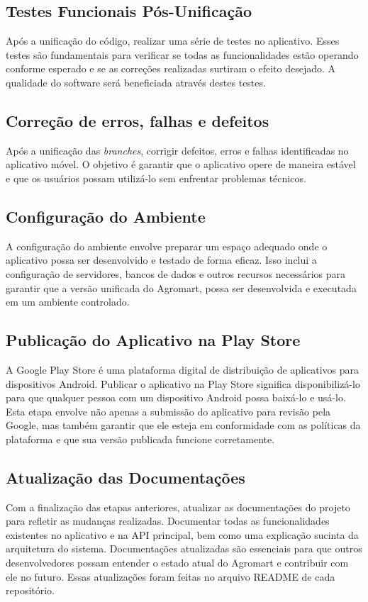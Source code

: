 \subsection{Testes Funcionais Pós-Unificação}
Após a unificação do código, realizar uma série de testes no aplicativo. Esses testes são fundamentais para verificar se todas as funcionalidades estão operando conforme esperado e se as correções realizadas surtiram o efeito desejado. A qualidade do software será beneficiada através destes testes.

\subsection{Correção de erros, falhas e defeitos}
Após a unificação das \textit{branches}, corrigir defeitos, erros e falhas identificadas no aplicativo móvel. O objetivo é garantir que o aplicativo opere de maneira estável e que os usuários possam utilizá-lo sem enfrentar problemas técnicos.

\subsection{Configuração do Ambiente}
A configuração do ambiente envolve preparar um espaço adequado onde o aplicativo possa ser desenvolvido e testado de forma eficaz. Isso inclui a configuração de servidores, bancos de dados e outros recursos necessários para garantir que a versão unificada do Agromart, possa ser desenvolvida e executada em um ambiente controlado.

\subsection{Publicação do Aplicativo na Play Store}
A Google Play Store é uma plataforma digital de distribuição de aplicativos para dispositivos Android. Publicar o aplicativo na Play Store significa disponibilizá-lo para que qualquer pessoa com um dispositivo Android possa baixá-lo e usá-lo. Esta etapa envolve não apenas a submissão do aplicativo para revisão pela Google, mas também garantir que ele esteja em conformidade com as políticas da plataforma e que sua versão publicada funcione corretamente.

\subsection{Atualização das Documentações}
Com a finalização das etapas anteriores, atualizar as documentações do projeto para refletir as mudanças realizadas. Documentar todas as funcionalidades existentes no aplicativo e na API principal, bem como uma explicação sucinta da arquitetura do sistema. Documentações atualizadas são essenciais para que outros desenvolvedores possam entender o estado atual do Agromart e contribuir com ele no futuro. Essas atualizações foram feitas no arquivo README de cada repositório.

